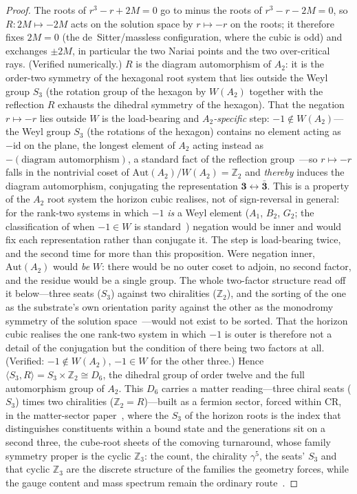 \documentclass[11pt,a4paper]{article}
\theoremstyle{definition}
\begin{document}
\begin{proof}
The roots of $r^{3}-r+2M=0$ go to minus the roots of $r^{3}-r-2M=0$, so $R:2M\mapsto-2M$ acts on the solution space by $r\mapsto-r$ on the roots; it therefore fixes $2M=0$ (the de~Sitter/massless configuration, where the cubic is odd) and exchanges $\pm2M$, in particular the two Nariai points and the two over-critical rays. (Verified numerically.) $R$ is the diagram automorphism of $A_{2}$: it is the order-two symmetry of the hexagonal root system that lies outside the Weyl group $S_{3}$ (the rotation group of the hexagon by $W(A_2)$ together with the reflection $R$ exhausts the dihedral symmetry of the hexagon). That the negation $r\mapsto-r$ lies outside $W$ is the load-bearing and \emph{$A_{2}$-specific} step: $-1\notin W(A_2)$---the Weyl group $S_{3}$ (the rotations of the hexagon) contains no element acting as $-\mathrm{id}$ on the plane, the longest element of $A_2$ acting instead as $-(\text{diagram automorphism})$, a standard fact of the reflection group~\cite{Humphreys1972}---so $r\mapsto-r$ falls in the nontrivial coset of $\mathrm{Aut}(A_2)/W(A_2)=\mathbb{Z}_2$ and \emph{thereby} induces the diagram automorphism, conjugating the representation $\mathbf 3\leftrightarrow\bar{\mathbf 3}$. This is a property of the $A_2$ root system the horizon cubic realises, not of sign-reversal in general: for the rank-two systems in which $-1$ \emph{is} a Weyl element ($A_1$, $B_2$, $G_2$; the classification of when $-1\in W$ is standard~\cite{Humphreys1972}) negation would be inner and would fix each representation rather than conjugate it. The step is load-bearing twice, and the second time for more than this proposition. Were negation inner, $\mathrm{Aut}(A_2)$ would \emph{be} $W$: there would be no outer coset to adjoin, no second factor, and the residue would be a single group. The whole two-factor structure read off it below---three seats ($S_3$) against two chiralities ($\mathbb{Z}_2$), and the sorting of the one as the substrate's own orientation parity against the other as the monodromy symmetry of the solution space~\cite{JanzenAlgebroid,JanzenMatter}---would not exist to be sorted. That the horizon cubic realises the one rank-two system in which $-1$ is outer is therefore not a detail of the conjugation but the condition of there being two factors at all. (Verified: $-1\notin W(A_2)$, $-1\in W$ for the other three.) Hence $\langle S_{3},R\rangle=S_{3}\times\mathbb{Z}_{2}\cong D_{6}$, the dihedral group of order twelve and the full automorphism group of $A_{2}$. This $D_{6}$ carries a matter reading---three chiral seats ($S_{3}$) times two chiralities ($\mathbb{Z}_{2}=R$)---built as a fermion sector, forced within CR, in the matter-sector paper~\cite{JanzenMatter}, where the $S_3$ of the horizon roots is the index that distinguishes constituents within a bound state and the generations sit on a second three, the cube-root sheets of the comoving turnaround, whose family symmetry proper is the cyclic $\mathbb{Z}_3$: the count, the chirality $\gamma^5$, the seats' $S_3$ and that cyclic $\mathbb{Z}_3$ are the discrete structure of the families the geometry forces, while the gauge content and mass spectrum remain the ordinary route~\cite{JanzenBoundary}.
\end{proof}
\end{document}

